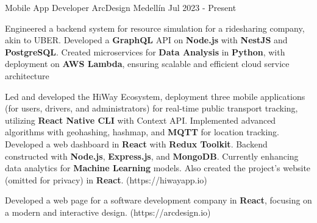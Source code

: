 
\begin{cventries}
  \cventry
  {Mobile App Developer} %
  {ArcDesign} %
  {Medellín} %
  {Jul 2023 - Present} %
  {
    \begin{cvitems} %
      \item {Engineered a backend system for resource simulation for a ridesharing company, akin to UBER. Developed a \textbf{GraphQL} API on \textbf{Node.js}
      with \textbf{NestJS} and \textbf{PostgreSQL}. Created microservices for \textbf{Data Analysis}
      in \textbf{Python}, with deployment on \textbf{AWS Lambda}, ensuring scalable and
      efficient cloud service architecture}
      \item {Led and developed the HiWay Ecosystem, deployment three mobile
      applications (for users, drivers, and administrators) for real-time
      public transport tracking, utilizing \textbf{React Native CLI} with Context API.
      Implemented advanced algorithms with geohashing, hashmap, and
      \textbf{MQTT} for location tracking. Developed a web dashboard in \textbf{React} with
      \textbf{Redux Toolkit}. Backend constructed with \textbf{Node.js}, \textbf{Express.js}, and
      \textbf{MongoDB}. Currently enhancing data analytics for \textbf{Machine Learning}
      models. Also created the project's website (omitted for privacy) in
      \textbf{React}. (https://hiwayapp.io)}
      \item {Developed a web page for a software development company in
      \textbf{React}, focusing on a modern and interactive design. (https://arcdesign.io)}
    \end{cvitems}
  }
\end{cventries}